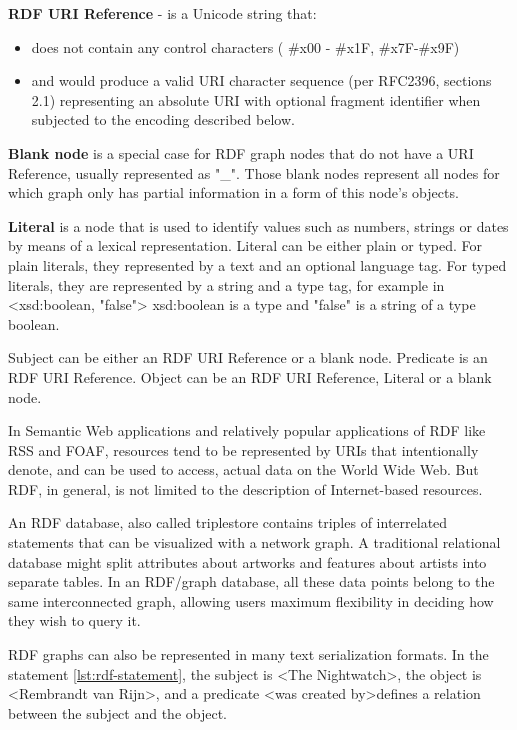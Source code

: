 \documentclass[thesis=M,english,hidelinks]{FITthesis}[2019/12/23]
\begin{document}
\textbf{\gls{RDF} \gls{URI} Reference} - is a Unicode string that:

\begin{itemize}
	\item does not contain any control characters ( \#x00 - \#x1F, \#x7F-\#x9F)
	\item and would produce a valid URI character sequence (per RFC2396\cite{rfc2396}, sections 2.1) representing an absolute URI with optional fragment identifier when subjected to the encoding described below.
\end{itemize}

\textbf{Blank node} is a special case for \gls{RDF} graph nodes that do not have a \gls{URI} Reference, usually represented as "\_". Those blank nodes represent all nodes for which graph only has partial information in a form of this node's objects.

\textbf{Literal} is a node that is used to identify values such as numbers, strings or dates by means of a lexical representation. Literal can be either plain or typed. For plain literals, they represented by a text and an optional language tag. For typed literals, they are represented by a string and a type tag, for example in <xsd:boolean, "false"> xsd:boolean is a type and  "false" is a string of a type boolean.

Subject can be either an \gls{RDF} \gls{URI} Reference or a blank node. 
Predicate is an \gls{RDF} \gls{URI} Reference.
Object can be an \gls{RDF} \gls{URI} Reference, Literal or a blank node.



In Semantic Web applications and relatively popular applications of \gls{RDF} like \gls{RSS} and \gls{FOAF}, resources tend to be represented by URIs that intentionally denote, and can be used to access, actual data on the World Wide Web. But \gls{RDF}, in general, is not limited to the description of Internet-based resources.

An \gls{RDF} database, also called triplestore contains triples of  interrelated statements that can be visualized with a network graph. A traditional relational database might split attributes about artworks and features about artists into separate tables. In an RDF/graph database, all these data points belong to the same interconnected graph, allowing users maximum flexibility in deciding how they wish to query it.

RDF graphs can also be represented in many text serialization formats. In the statement \ref{lst:rdf-statement}, the subject is \textless The Nightwatch\textgreater, the object is \textless Rembrandt van Rijn\textgreater , and a predicate \textless was created by\textgreater  defines a relation between the subject and the object.
\end{document}
